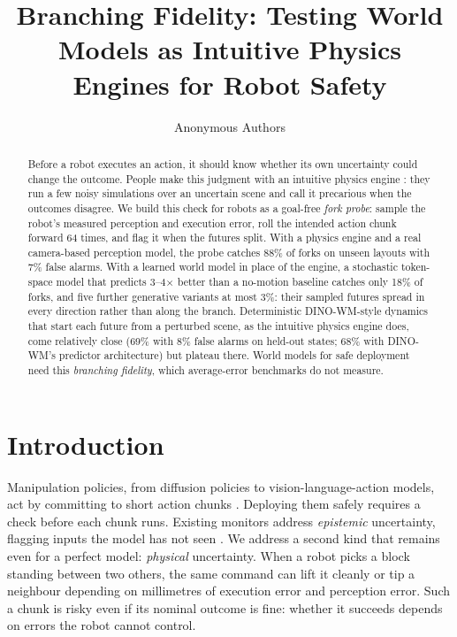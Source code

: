 \documentclass{article}
\title{Branching Fidelity: Testing World Models as Intuitive Physics Engines for Robot Safety}
\author{Anonymous Authors}
\begin{document}
\maketitle

\begin{abstract}
Before a robot executes an action, it should know whether its own uncertainty could change the outcome.
People make this judgment with an intuitive physics engine \citep{battaglia2013simulation}: they run a
few noisy simulations over an uncertain scene and call it precarious when the outcomes disagree. We
build this check for robots as a goal-free \emph{fork probe}: sample the robot's measured perception and
execution error, roll the intended action chunk forward 64 times, and flag it when the futures split.
With a physics engine and a real camera-based perception model, the probe catches 88\% of forks on
unseen layouts with 7\% false alarms. With a learned world model in place of the engine, a stochastic
token-space model that predicts 3--4$\times$ better than a no-motion baseline catches only 18\% of forks,
and five further generative variants at most 3\%: their sampled futures spread in every direction rather
than along the branch. Deterministic DINO-WM-style dynamics that start each
future from a perturbed scene, as the intuitive physics engine does, come relatively close (69\% with 8\%
false alarms on held-out states; 68\% with DINO-WM's predictor architecture) but plateau there. World models for safe deployment need
this \emph{branching fidelity}, which average-error benchmarks do not measure.
\end{abstract}


\section{Introduction}
Manipulation policies, from diffusion policies to vision-language-action models, act by committing to
short action chunks \citep{chi2023diffusion,zhao2023act,black2024pi0}. Deploying them safely requires a
check before each chunk runs. Existing monitors address \emph{epistemic} uncertainty, flagging inputs the
model has not seen \citep{seo2025uncertainty,xu2025failure}. We address a second kind that remains even
for a perfect model: \emph{physical} uncertainty. When a robot picks a block standing between two
others, the same command can lift it cleanly or tip a neighbour depending on millimetres of execution error and
perception error. Such a chunk is risky even if its nominal outcome is fine: whether it succeeds depends on errors the
robot cannot control.
\end{document}
